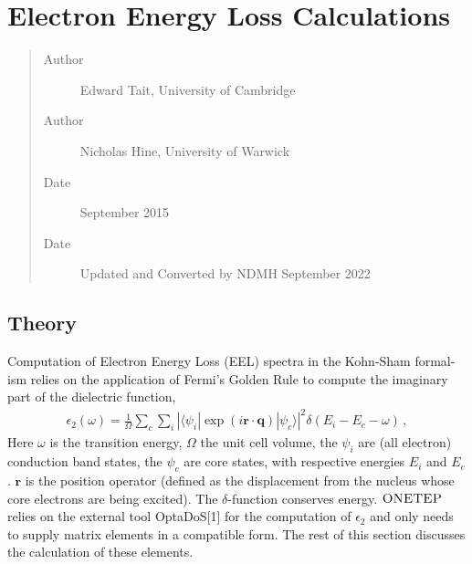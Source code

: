 \documentclass[letterpaper,10pt,english]{sphinxmanual}
\begin{document}
\section{Electron Energy Loss Calculations}
\label{\detokenize{eels_in_onetep:electron-energy-loss-calculations}}\label{\detokenize{eels_in_onetep::doc}}\begin{quote}\begin{description}
\item[{Author}] \leavevmode
Edward Tait, University of Cambridge

\item[{Author}] \leavevmode
Nicholas Hine, University of Warwick

\item[{Date}] \leavevmode
September 2015

\item[{Date}] \leavevmode
Updated and Converted by NDMH September 2022

\end{description}\end{quote}


\subsection{Theory}
\label{\detokenize{eels_in_onetep:theory}}
Computation of Electron Energy Loss (EEL) spectra in the Kohn-Sham formal-
ism relies on the application of Fermi’s Golden Rule to compute the imaginary
part of the dielectric function,
\begin{equation*}
\begin{split}\epsilon_2(\omega) = \frac{1}{\Omega} \sum\limits_{c}\sum\limits_{i} |\langle  \psi_i| \exp(i\mathbf{r}\cdot\mathbf{q})
| \psi_c \rangle |^2 \delta (E_i - E_c - \omega)\,,\end{split}
\end{equation*}
Here \(\omega\) is the transition energy, \(\Omega\) the unit cell
volume, the \(\psi_i\) are (all electron) conduction band states,
the \(\psi_c\) are core states, with respective energies \(E_i\)
and \(E_c\). \(\mathbf{r}\) is the position operator
(defined as the displacement from the nucleus
whose core electrons are being excited). The \(\delta\)-function
conserves energy. \(\textsc{ONETEP}\) relies on the external tool
OptaDoS{[}1{]} for the computation of \(\epsilon_2\)
and only needs to supply matrix elements in a compatible form. The rest of
this section discusses the calculation of these elements.
\end{document}

